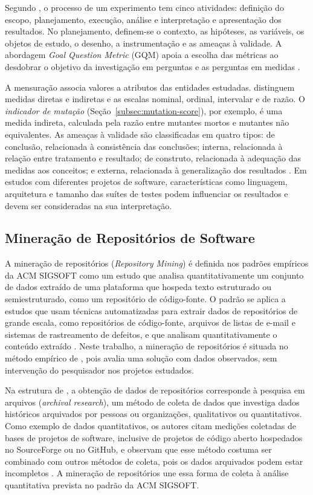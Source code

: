 Segundo , o processo de um experimento tem cinco atividades: definição do escopo, planejamento, execução, análise e interpretação e apresentação dos resultados. No planejamento, definem-se o contexto, as hipóteses, as variáveis, os objetos de estudo, o desenho, a instrumentação e as ameaças à validade. A abordagem \textit{Goal Question Metric} (GQM) apoia a escolha das métricas ao desdobrar o objetivo da investigação em perguntas e as perguntas em medidas \cite{basili1994}.

A mensuração associa valores a atributos das entidades estudadas.  distinguem medidas diretas e indiretas e as escalas nominal, ordinal, intervalar e de razão. O \textit{indicador de mutação} (Seção~\ref{subsec:mutation-score}), por exemplo, é uma medida indireta, calculada pela razão entre mutantes mortos e mutantes não equivalentes. As ameaças à validade são classificadas em quatro tipos: de conclusão, relacionada à consistência das conclusões; interna, relacionada à relação entre tratamento e resultado; de construto, relacionada à adequação das medidas aos conceitos; e externa, relacionada à generalização dos resultados \cite{wohlin2015}. Em estudos com diferentes projetos de software, características como linguagem, arquitetura e tamanho das suítes de testes podem influenciar os resultados e devem ser consideradas na sua interpretação.

\subsection{Mineração de Repositórios de Software}

A mineração de repositórios (\textit{Repository Mining}) é definida nos padrões empíricos da ACM SIGSOFT como um estudo que analisa quantitativamente um conjunto de dados extraído de uma plataforma que hospeda texto estruturado ou semiestruturado, como um repositório de código-fonte. O padrão se aplica a estudos que usam técnicas automatizadas para extrair dados de repositórios de grande escala, como repositórios de código-fonte, arquivos de listas de e-mail e sistemas de rastreamento de defeitos, e que analisam quantitativamente o conteúdo extraído \cite{acmsigsoft}. Neste trabalho, a mineração de repositórios é situada no método empírico de , pois avalia uma solução com dados observados, sem intervenção do pesquisador nos projetos estudados.

Na estrutura de , a obtenção de dados de repositórios corresponde à pesquisa em arquivos (\textit{archival research}), um método de coleta de dados que investiga dados históricos arquivados por pessoas ou organizações, qualitativos ou quantitativos. Como exemplo de dados quantitativos, os autores citam medições coletadas de bases de projetos de software, inclusive de projetos de código aberto hospedados no SourceForge ou no GitHub, e observam que esse método costuma ser combinado com outros métodos de coleta, pois os dados arquivados podem estar incompletos \cite{wohlin2015}. A mineração de repositórios une essa forma de coleta à análise quantitativa prevista no padrão da ACM SIGSOFT.

